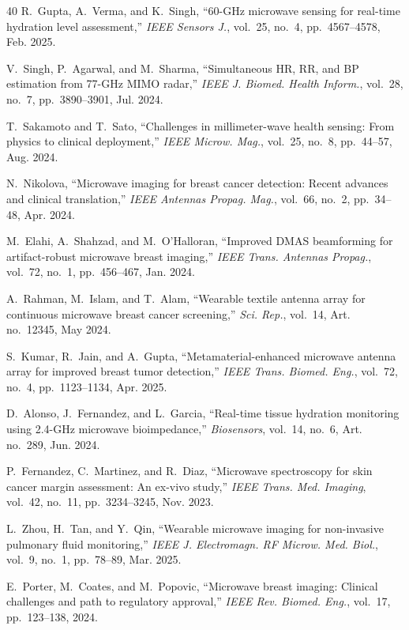\documentclass[journal,twoside]{IEEEtran}
\begin{document}
\begin{thebibliography}{40}
R.~Gupta, A.~Verma, and K.~Singh, ``60-GHz microwave sensing for real-time hydration level assessment,'' \textit{IEEE Sensors J.}, vol.~25, no.~4, pp.~4567--4578, Feb. 2025.

V.~Singh, P.~Agarwal, and M.~Sharma, ``Simultaneous HR, RR, and BP estimation from 77-GHz MIMO radar,'' \textit{IEEE J. Biomed. Health Inform.}, vol.~28, no.~7, pp.~3890--3901, Jul. 2024.

T.~Sakamoto and T.~Sato, ``Challenges in millimeter-wave health sensing: From physics to clinical deployment,'' \textit{IEEE Microw. Mag.}, vol.~25, no.~8, pp.~44--57, Aug. 2024.

N.~Nikolova, ``Microwave imaging for breast cancer detection: Recent advances and clinical translation,'' \textit{IEEE Antennas Propag. Mag.}, vol.~66, no.~2, pp.~34--48, Apr. 2024.

M.~Elahi, A.~Shahzad, and M.~O'Halloran, ``Improved DMAS beamforming for artifact-robust microwave breast imaging,'' \textit{IEEE Trans. Antennas Propag.}, vol.~72, no.~1, pp.~456--467, Jan. 2024.

A.~Rahman, M.~Islam, and T.~Alam, ``Wearable textile antenna array for continuous microwave breast cancer screening,'' \textit{Sci. Rep.}, vol.~14, Art. no.~12345, May 2024.

S.~Kumar, R.~Jain, and A.~Gupta, ``Metamaterial-enhanced microwave antenna array for improved breast tumor detection,'' \textit{IEEE Trans. Biomed. Eng.}, vol.~72, no.~4, pp.~1123--1134, Apr. 2025.

D.~Alonso, J.~Fernandez, and L.~Garcia, ``Real-time tissue hydration monitoring using 2.4-GHz microwave bioimpedance,'' \textit{Biosensors}, vol.~14, no.~6, Art. no.~289, Jun. 2024.

P.~Fernandez, C.~Martinez, and R.~Diaz, ``Microwave spectroscopy for skin cancer margin assessment: An ex-vivo study,'' \textit{IEEE Trans. Med. Imaging}, vol.~42, no.~11, pp.~3234--3245, Nov. 2023.

L.~Zhou, H.~Tan, and Y.~Qin, ``Wearable microwave imaging for non-invasive pulmonary fluid monitoring,'' \textit{IEEE J. Electromagn. RF Microw. Med. Biol.}, vol.~9, no.~1, pp.~78--89, Mar. 2025.

E.~Porter, M.~Coates, and M.~Popovic, ``Microwave breast imaging: Clinical challenges and path to regulatory approval,'' \textit{IEEE Rev. Biomed. Eng.}, vol.~17, pp.~123--138, 2024.


\end{thebibliography}
\end{document}
